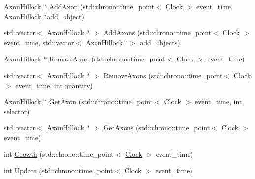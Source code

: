 \begin{DoxyCompactItemize}
\item 
\mbox{\hyperlink{classAxonHillock}{Axon\+Hillock}} $\ast$ \mbox{\hyperlink{classAxonHillock_a02bfbaea9ea7a160933f8500c8b41d6a}{Add\+Axon}} (std\+::chrono\+::time\+\_\+point$<$ \mbox{\hyperlink{universe_8h_a0ef8d951d1ca5ab3cfaf7ab4c7a6fd80}{Clock}} $>$ event\+\_\+time, \mbox{\hyperlink{classAxonHillock}{Axon\+Hillock}} $\ast$add\+\_\+object)
\item 
std\+::vector$<$ \mbox{\hyperlink{classAxonHillock}{Axon\+Hillock}} $\ast$ $>$ \mbox{\hyperlink{classAxonHillock_a54a82227b96757f1c0d7450df6a3df37}{Add\+Axons}} (std\+::chrono\+::time\+\_\+point$<$ \mbox{\hyperlink{universe_8h_a0ef8d951d1ca5ab3cfaf7ab4c7a6fd80}{Clock}} $>$ event\+\_\+time, std\+::vector$<$ \mbox{\hyperlink{classAxonHillock}{Axon\+Hillock}} $\ast$$>$ add\+\_\+objects)
\item 
\mbox{\hyperlink{classAxonHillock}{Axon\+Hillock}} $\ast$ \mbox{\hyperlink{classAxonHillock_ae7c379ef3a70c8a43a0f105ccc94b54b}{Remove\+Axon}} (std\+::chrono\+::time\+\_\+point$<$ \mbox{\hyperlink{universe_8h_a0ef8d951d1ca5ab3cfaf7ab4c7a6fd80}{Clock}} $>$ event\+\_\+time)
\item 
std\+::vector$<$ \mbox{\hyperlink{classAxonHillock}{Axon\+Hillock}} $\ast$ $>$ \mbox{\hyperlink{classAxonHillock_a7f10edff727271408887d29a70e7e671}{Remove\+Axons}} (std\+::chrono\+::time\+\_\+point$<$ \mbox{\hyperlink{universe_8h_a0ef8d951d1ca5ab3cfaf7ab4c7a6fd80}{Clock}} $>$ event\+\_\+time, int quantity)
\item 
\mbox{\hyperlink{classAxonHillock}{Axon\+Hillock}} $\ast$ \mbox{\hyperlink{classAxonHillock_a08fde7d1b8a40ba7a052315f95b743f0}{Get\+Axon}} (std\+::chrono\+::time\+\_\+point$<$ \mbox{\hyperlink{universe_8h_a0ef8d951d1ca5ab3cfaf7ab4c7a6fd80}{Clock}} $>$ event\+\_\+time, int selector)
\item 
std\+::vector$<$ \mbox{\hyperlink{classAxonHillock}{Axon\+Hillock}} $\ast$ $>$ \mbox{\hyperlink{classAxonHillock_af35663768cbe818e092382519a6d73e3}{Get\+Axons}} (std\+::chrono\+::time\+\_\+point$<$ \mbox{\hyperlink{universe_8h_a0ef8d951d1ca5ab3cfaf7ab4c7a6fd80}{Clock}} $>$ event\+\_\+time)
\item 
int \mbox{\hyperlink{classAxonHillock_a5c5cd9008f1410898980528b959d668e}{Growth}} (std\+::chrono\+::time\+\_\+point$<$ \mbox{\hyperlink{universe_8h_a0ef8d951d1ca5ab3cfaf7ab4c7a6fd80}{Clock}} $>$ event\+\_\+time)
\item 
int \mbox{\hyperlink{classAxonHillock_a5a6a6a93a98b32c303b9ee6320c09909}{Update}} (std\+::chrono\+::time\+\_\+point$<$ \mbox{\hyperlink{universe_8h_a0ef8d951d1ca5ab3cfaf7ab4c7a6fd80}{Clock}} $>$ event\+\_\+time)
\end{DoxyCompactItemize}
